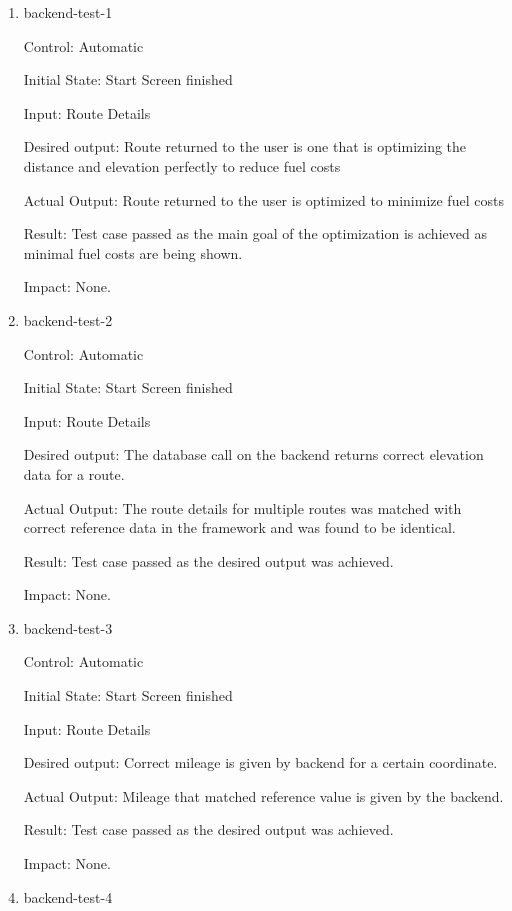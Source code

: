 \documentclass[12pt, titlepage]{article}
\begin{document}
\begin{enumerate}

\item{backend-test-1\\}

Control: Automatic
					
Initial State: Start Screen finished
					
Input: Route Details

Desired output: Route returned to the user is one that is optimizing the distance and elevation perfectly to reduce fuel costs

Actual Output: Route returned to the user is optimized to minimize fuel costs

Result: Test case passed as the main goal of the optimization is achieved as minimal fuel costs are being shown.

Impact: None.
					
\item{backend-test-2\\}

Control: Automatic
					
Initial State: Start Screen finished
					
Input: Route Details

Desired output: The database call on the backend returns correct elevation data for a route.

Actual Output: The route details for multiple routes was matched with correct reference data in the framework and was found to be identical.

Result: Test case passed as the desired output was achieved.

Impact: None.
					
\item{backend-test-3\\}

Control: Automatic
					
Initial State: Start Screen finished
					
Input: Route Details

Desired output: Correct mileage is given by backend for a certain coordinate.

Actual Output: Mileage that matched reference value is given by the backend.

Result: Test case passed as the desired output was achieved.

Impact: None.
					
\item{backend-test-4\\}


\end{enumerate}
\end{document}
